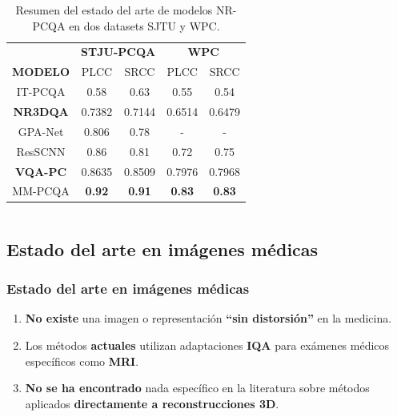 \begin{frame}
\begin{columns}
      \begin{table}[htp]
          \footnotesize
          \centering
          \begin{tabular}{|c|c|c|c|c|}
              \hline
              \rowcolor[HTML]{FFC702}
              \cellcolor[HTML]{FFC702} & \multicolumn{2}{c|}{\cellcolor[HTML]{FFC702}\textbf{STJU-PCQA}} & \multicolumn{2}{c|}{\cellcolor[HTML]{FFC702}\textbf{WPC}} \\ 
              \cline{2-5}
             \multirow{-2}{*}{\cellcolor[HTML]{FFC702}\textbf{MODELO}}  &\multicolumn{1}{c|}{\cellcolor[HTML]{FFC702} PLCC} & \multicolumn{1}{c|}{\cellcolor[HTML]{FFC702}SRCC} & \multicolumn{1}{c|}{\cellcolor[HTML]{FFC702}PLCC} & \multicolumn{1}{c|}{\cellcolor[HTML]{FFC702}SRCC} \\
              \hline
              IT-PCQA & 0.58 & 0.63 & 0.55  & 0.54\\
              \hline
              \textbf<2->{NR3DQA} & 0.7382 & 0.7144 & 0.6514 & 0.6479\\
              \hline
              GPA-Net & 0.806 & 0.78 & - & - \\
              \hline
              ResSCNN & 0.86 & 0.81 & 0.72 & 0.75\\
              \hline
              \textbf<3->{VQA-PC} & 0.8635 & 0.8509 & 0.7976 & 0.7968\\
              \hline
              MM-PCQA & \textbf{0.92} & \textbf{0.91} & \textbf{0.83} & \textbf{0.83}\\
              \hline
          \end{tabular}
          \caption[Estado del arte de modelos NR-PCQA]{
          Resumen del estado del arte de modelos NR-PCQA en dos datasets SJTU y WPC.
        }
      \end{table}
  \end{columns}
\end{frame}

\subsection{Estado del arte en imágenes médicas}
\begin{frame}
  \frametitle{Estado del arte en imágenes médicas}
  \begin{enumerate}
    \item \textbf{No existe} una imagen o representación \textbf{``sin distorsión''} en la medicina.
    \item Los métodos \textbf{actuales} utilizan adaptaciones \textbf{IQA} para 
      exámenes médicos específicos como \textbf{MRI}.
    \item \textbf{No se ha encontrado} nada específico en la literatura sobre 
      métodos aplicados \textbf{directamente a reconstrucciones 3D}.
  \end{enumerate}
\end{frame}
